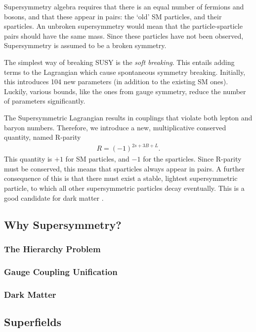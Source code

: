\documentclass[twoside,english]{uiofysmaster}
\begin{document}
Supersymmetry algebra requires that there is an equal number of fermions and bosons, and that these appear in pairs: the `old' SM particles, and their sparticles. An unbroken supersymmetry would mean that the particle-sparticle pairs should have the same mass. Since these particles have not been observed, Supersymmetry is assumed to be a broken symmetry.

The simplest way of breaking SUSY is the \textit{soft breaking}. This entails adding terms to the Lagrangian which cause spontaneous symmetry breaking. Initially, this introduces 104 new parameters (in addition to the existing SM ones). Luckily, various bounds, like the ones from gauge symmetry, reduce the number of parameters significantly. 

The Supersymmetric Lagrangian results in couplings that violate both lepton and baryon numbers. Therefore, we introduce a new, multiplicative conserved quantity, named R-parity
\begin{align}\label{Eq:: R-parity}
R = (-1)^{2s + 3B + L}.
\end{align}
This quantity is $+1$ for SM particles, and $-1$ for the sparticles. Since R-parity must be conserved, this means that sparticles always appear in pairs. A further consequence of this is that there must exist a stable, lightest supersymmetric particle, to which all other supersymmetric particles decay eventually. This is a good candidate for dark matter \cite{weinberg_1995}.


\subsection{Why Supersymmetry?}

\subsubsection{The Hierarchy Problem}

\subsubsection{Gauge Coupling Unification}

\subsubsection{Dark Matter}

\subsection{Superfields}
\end{document}
